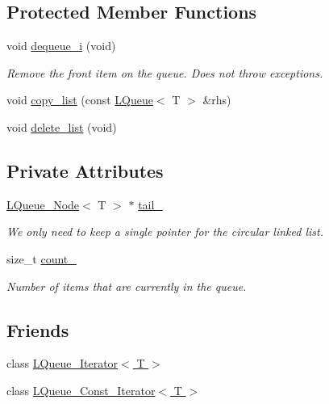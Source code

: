 \subsection*{Protected Member Functions}
\begin{DoxyCompactItemize}
\item 
void \hyperlink{classMadara_1_1Utility_1_1LQueue_abbc623b6b78bcf6fb815dab00cb7662e}{dequeue\_\-i} (void)
\begin{DoxyCompactList}\small\item\em Remove the front item on the queue. Does not throw exceptions. \item\end{DoxyCompactList}\item 
void \hyperlink{classMadara_1_1Utility_1_1LQueue_a4883f2c9831323e88daf8dd15f554aa3}{copy\_\-list} (const \hyperlink{classMadara_1_1Utility_1_1LQueue}{LQueue}$<$ T $>$ \&rhs)
\item 
void \hyperlink{classMadara_1_1Utility_1_1LQueue_a30e4fd6ee32b07c9c7446d90b9c57179}{delete\_\-list} (void)
\end{DoxyCompactItemize}
\subsection*{Private Attributes}
\begin{DoxyCompactItemize}
\item 
\hyperlink{classMadara_1_1Utility_1_1LQueue__Node}{LQueue\_\-Node}$<$ T $>$ $\ast$ \hyperlink{classMadara_1_1Utility_1_1LQueue_af5c1db41541efbedd186a17cc2714b66}{tail\_\-}
\begin{DoxyCompactList}\small\item\em We only need to keep a single pointer for the circular linked list. \item\end{DoxyCompactList}\item 
size\_\-t \hyperlink{classMadara_1_1Utility_1_1LQueue_a02709c963731b73e3a762928751a29c9}{count\_\-}
\begin{DoxyCompactList}\small\item\em Number of items that are currently in the queue. \item\end{DoxyCompactList}\end{DoxyCompactItemize}
\subsection*{Friends}
\begin{DoxyCompactItemize}
\item 
class \hyperlink{classMadara_1_1Utility_1_1LQueue_a6b7cc6b02ab011daa89db3ab25c2d1c5}{LQueue\_\-Iterator$<$ T $>$}
\item 
class \hyperlink{classMadara_1_1Utility_1_1LQueue_a5375c049d93ee611e2c8b38c64dd16a8}{LQueue\_\-Const\_\-Iterator$<$ T $>$}
\end{DoxyCompactItemize}


